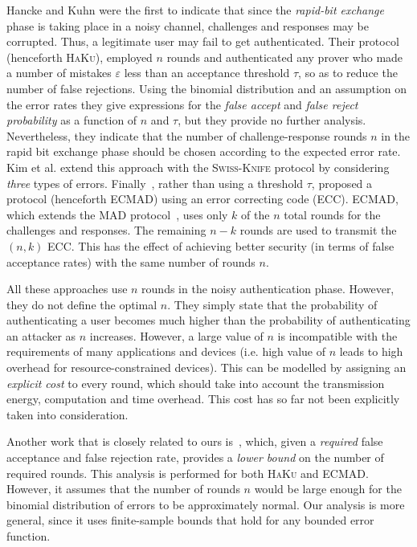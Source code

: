 \documentclass[a4paper]{article}
\newcommand \err {\varepsilon}
\newcommand \Swiss {\textsc{Swiss-Knife}}
\newcommand \ECMAD {\textsc{ECMAD}}
\newcommand \MAD {\textsc{MAD}}
\newcommand \Hancke {\textsc{HaKu}}
\theoremstyle{plain} \newtheorem{remark}{Remark}
\theoremstyle{plain} \newtheorem{definition}{Definition}
\theoremstyle{plain} \newtheorem{example}{Example}
\theoremstyle{plain} \newtheorem{assumption}{Assumption}
\theoremstyle{plain} \newtheorem{conjecture}{Conjecture}
\theoremstyle{plain} \newtheorem{theorem}{Theorem}
\theoremstyle{plain} \newtheorem{proposition}{Proposition}
\theoremstyle{plain} \newtheorem{lemma}{Lemma}
\theoremstyle{plain} \newtheorem{corollary}{Corollary}
\begin{document}
Hancke and Kuhn \cite{hancke05} were the first to indicate that since
the \textit{rapid-bit exchange} phase is taking place in a noisy
channel, challenges and responses may be corrupted.  Thus, a
legitimate user may fail to get authenticated.  Their protocol (henceforth
\Hancke), employed $n$ rounds and authenticated any prover who made a
number of mistakes $\err$ less than an acceptance threshold $\tau$, so
as to reduce the number of false rejections.  Using the binomial
distribution and an assumption on the error rates they give
expressions for the \textit{false accept} and \textit{false reject
  probability} as a function of $n$ and $\tau$, but they provide no
further analysis.  Nevertheless, they indicate that the number of
challenge-response rounds $n$ in the rapid bit exchange phase should
be chosen according to the expected error rate.  Kim et
al. \cite{KimAKSP-2008-icisc} extend this approach with the {\Swiss}
protocol by considering {\em three} types of errors. 
Finally~\cite{singelee1}, rather than using a threshold $\tau$,
proposed a protocol (henceforth {\ECMAD}) using an error correcting
code (ECC).  {\ECMAD}, which extends the {\MAD}
protocol~\cite{capkun}, uses only $k$ of the $n$ total rounds for the
challenges and responses. The remaining $n-k$ rounds are used to
transmit the $(n,k)$ ECC.  This has the effect of achieving better
security (in terms of false acceptance rates) with the same number of
rounds $n$.

All these approaches use $n$ rounds in the noisy authentication phase.
However, they do not define the optimal $n$.  They simply state that
the probability of authenticating a user becomes much higher than the
probability of authenticating an attacker as $n$ increases.  However,
a large value of $n$ is incompatible with the requirements of many
applications and devices (i.e. high value of $n$ leads to high
overhead for resource-constrained devices). This can be modelled by
assigning an {\em explicit cost} to every round, which should take
into account the transmission energy, computation and time overhead.
This cost has so far not been explicitly taken into consideration.


Another work that is closely related to ours is~\cite{singelee2},
which, given a {\em required} false acceptance and false rejection
rate, provides a {\em lower bound} on the number of required
rounds. This analysis is performed for both {\Hancke} and
{\ECMAD}. However, it assumes that the number of rounds $n$ would be
large enough for the binomial distribution of errors to be
approximately normal.  Our analysis is more general, since it uses
finite-sample bounds that hold for any bounded error function.
\end{document}
